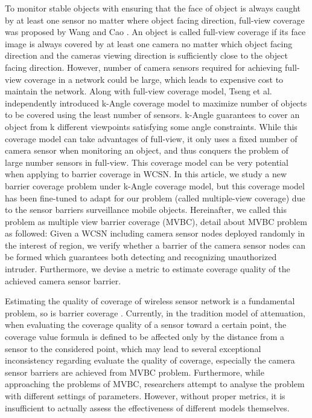 \documentclass[3p]{elsarticle}
\begin{document}
To monitor stable objects with ensuring that the face of object is always caught by at least one sensor no matter where object facing direction, full-view coverage was proposed by Wang and Cao \cite{wang2013achieving}. An object is called full-view coverage if its face image is always covered by at least one camera no matter which object facing direction and the cameras viewing direction is sufficiently close to the object facing direction.  
However, number of camera sensors required for achieving full-view coverage in a network could be large, which leads to expensive cost to maintain the network. Along with full-view coverage model, Tseng et al. \cite{tseng2012k} independently introduced k-Angle coverage model to maximize number of objects to be covered using the least number of sensors. k-Angle guarantees to cover an object from k different viewpoints satisfying some angle constraints. While this coverage model can take advantages of full-view, it only uses a fixed number of camera sensor when monitoring an object, and thus conquers the problem of large number sensors in full-view. 
This coverage model can be very potential when applying to barrier coverage in WCSN. In this article, we study a new barrier coverage problem under k-Angle coverage model, but this coverage model has been fine-tuned to adapt for our problem (called multiple-view coverage) due to the sensor barriers surveillance mobile objects. Hereinafter, we called this problem as multiple view barrier coverage (MVBC), detail about MVBC problem as followed: Given a WCSN including camera sensor nodes deployed randomly in the interest of region, we verify whether a barrier of the camera sensor nodes can be formed  which guarantees both detecting and recognizing unauthorized intruder. Furthermore, we devise a metric to estimate coverage quality of the achieved camera sensor barrier. \par
%
Estimating the quality of coverage of wireless sensor network is a  fundamental problem, so is barrier coverage \cite{sangwan2015survey,ghosh2008coverage}. Currently, in the tradition model of attenuation, when evaluating the coverage quality of a sensor toward a certain point, the coverage value formula is defined to be affected only by the distance from a sensor to the considered point, which may lead to several exceptional inconsistency regarding evaluate the quality of coverage, especially the camera sensor barriers are achieved from MVBC problem. Furthermore, while approaching the problems of MVBC, researchers attempt to analyse the problem with different settings of parameters. However, without proper metrics, it is insufficient to actually assess the effectiveness of different models themselves.
\end{document}
